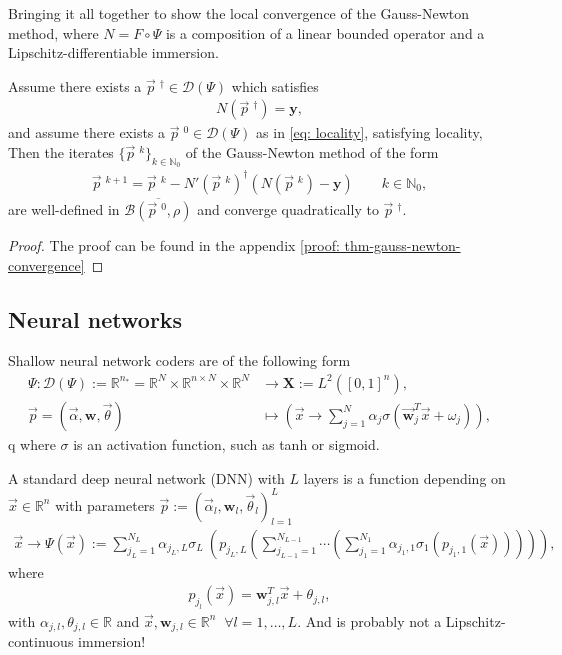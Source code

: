 Bringing it all together to show the local convergence of the Gauss-Newton
method, where $N = F\circ \Psi$ is a composition of a linear bounded operator
and a Lipschitz-differentiable immersion.
\begin{theorem}
    \label{thm: gauss-newton-convergence}
    Assume there exists a $\vec{p}\;^{\dagger} \in \mathcal{D}(\Psi)$ which
    satisfies
    \begin{align}
        N(\vec{p}\;^{\dagger}) = \mathbf{y},
    \end{align}
    and assume there exists a $\vec{p}\;^{0} \in \mathcal{D}(\Psi)$ as in
    \ref{eq: locality}, satisfying locality, Then the iterates
    $\{\vec{p}\;^{k}\}_{k\in \mathbb{N}_0}$  of the Gauss-Newton method of
    the form
     \begin{align}
         \vec{p}\;^{k+1} = \vec{p}\;^{k} - N'(\vec{p}\;^{k})^{\dagger}\left(
         N\left(\vec{p}\;^{k}  \right) - \mathbf{y} \right)  \qquad k \in
         \mathbb{N}_0, \label{eq: gauss-newton-iteration}
     \end{align}
     are well-defined in $\overline{\mathcal{B}\left(\vec{p}\;^{0}, \rho
     \right) }$ and converge quadratically to $\vec{p}\;^{\dagger}$.
\end{theorem}
\begin{proof}
    The proof can be found in the appendix \ref{proof: thm-gauss-newton-convergence}
\end{proof}


\subsection{Neural networks}
Shallow neural network coders are of the following form
\begin{align}
    \Psi:
    \mathcal{D}(\Psi) := \mathbb{R}^{n_*} =
    \mathbb{R}^{N}\times \mathbb{R}^{n \times N}
    \times \mathbb{R}^{N}
    &\to \mathbf{X} :=
    L^{2}\left([0, 1]^{n}\right),\\
    \vec{p} = (\vec{\alpha}, \mathbf{w}, \vec{\theta}) &\mapsto
    \left(\vec{x} \to \sum_{j=1}^{N} \alpha_j\sigma\left(
    \vec{\mathbf{w}}_j^{T}\vec{x} + \omega_j \right)  \right),
\end{align}q
where $\sigma$ is an activation function, such as tanh or sigmoid.

A standard deep neural network (DNN) with $L$ layers is a function depending on $\vec{x} \in
\mathbb{R}^{n}$ with parameters $\vec{p}:=\left( \vec{\alpha}_l,
\mathbf{w}_l, \vec{\theta}_l  \right)_{l=1}^{L}$
\begin{align}
    \vec{x}\to\Psi(\vec{x}) := \sum_{j_L=1}^{N_L} \alpha_{j_L,L}\sigma_L\
    \left( p_{j_L, L} \left( \sum_{j_{L-1}=1}^{N_{L-1}}\cdots
    \left( \sum_{j_1=1}^{N_1}\alpha_{j_1,1}\sigma_1\left(p_{j_1,1}(\vec{x})
    \right)  \right)  \right)  \right),
\end{align}
where
\begin{align}
    p_{j_l}(\vec{x}) = \mathbf{w}_{j, l}^{T}\vec{x} + \theta_{j,l},
\end{align}
with $\alpha_{j,l}, \theta_{j,l} \in \mathbb{R}$ and $\vec{x},
\mathbf{w}_{j,l} \in \mathbb{R}^{n} \;\; \forall l=1,\ldots,L$. And is
probably not a Lipschitz-continuous immersion!


